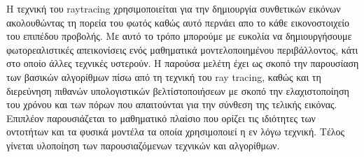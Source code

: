 
\begin{abstracts}        %

Η τεχνική του raytracing χρησιμοποιείται για την δημιουργία συνθετικών εικόνων ακολουθώντας
τη πορεία του φωτός καθώς αυτό περνάει απο το κάθε εικονοστοιχείο του επιπέδου προβολής.
Με αυτό το τρόπο μπορούμε με ευκολία να δημιουργήσουμε φωτορεαλιστικές απεικονίσεις ενός μαθηματικά
μοντελοποιημένου περιβάλλοντος, κάτι στο οποίο άλλες τεχνικές υστερούν. Η παρούσα μελέτη
έχει ως σκοπό την παρουσίαση των βασικών αλγορίθμων πίσω από τη τεχνική του ray tracing, καθώς
και τη διερεύνηση πιθανών υπολογιστικών βελτίστοποιήσεων με σκοπό την ελαχιστοποίηση του 
χρόνου και των πόρων που απαιτούνται για την σύνθεση της τελικής εικόνας. Επιπλέον παρουσιάζεται
το μαθηματικό πλαίσιο που ορίζει τις ιδιότητες των οντοτήτων και τα φυσικά μοντέλα τα οποία 
χρησιμοποιεί η εν λόγω τεχνική. Τέλος γίνεται υλοποίηση των παρουσιαζόμενων τεχνικών και
αλγορίθμων.

\end{abstracts}

